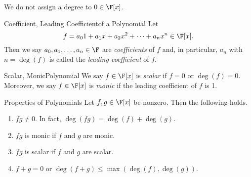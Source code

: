 \documentclass[math_245.tex]{subfiles}
\begin{document}
    \begin{remark}
        We do not assign a degree to $0\in \F[x]$.
    \end{remark}

    \begin{definition}{Coefficient, Leading Coefficient}{of a Polynomial}
        Let
        \begin{equation*}
            f = a_0 1+ a_1x + a_2x^2 + \cdots + a_nx^n\in \F[x].
        \end{equation*}
        Then we say $a_0, a_1, \ldots, a_n\in \F$ are \emph{coefficients} of $f$ and, in particular, $a_n$ with $n=\deg(f)$ is called the \emph{leading coefficient} of $f$.
    \end{definition}

    \begin{definition}{Scalar, Monic}{Polynomial}
        We say $f\in \F[x]$ is \emph{scalar} if $f=0$ or $\deg(f) = 0$. Moreover, we say $f\in\F[x]$ is \emph{monic} if the leading coefficient of $f$ is 1. 
    \end{definition}

    \begin{prop}{Properties of Polynomials}
        Let $f, g\in \F[x]$ be nonzero. Then the following holds.
        \begin{enumerate}
            \item $fg\neq 0$. In fact, $\deg(fg) = \deg(f)+\deg(g)$.

            \item $fg$ is monic if $f$ and $g$ are monic.

            \item $fg$ is scalar if $f$ and $g$ are scalar.

            \item $f+g = 0$ or $\deg(f+g)\leq \max \left( \deg(f), \deg(g) \right)$.
             
        \end{enumerate}
    \end{prop}
\end{document}
